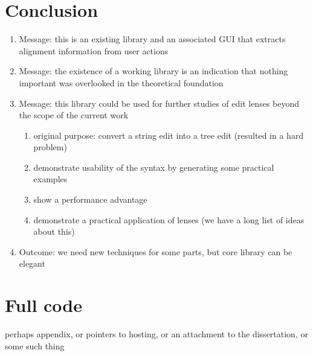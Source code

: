 \section{Conclusion}
\label{sec:impl-conclusion}
\begin{enumerate}
    \item Message: this is an existing library and an associated GUI that extracts alignment information from user actions
    \item Message: the existence of a working library is an indication that nothing important was overlooked in the theoretical foundation
    \item Message: this library could be used for further studies of edit lenses beyond the scope of the current work
        \begin{enumerate}
            \item original purpose: convert a string edit into a tree edit (resulted in a hard problem)
            \item demonstrate usability of the syntax by generating some practical examples
            \item show a performance advantage
            \item demonstrate a practical application of lenses (we have a long list of ideas about this)
        \end{enumerate}
    \item Outcome: we need new techniques for some parts, but core library can be elegant
\end{enumerate}

\section{Full code}
\label{sec:impl-code}
perhaps appendix, or pointers to hosting, or an attachment to the dissertation, or some such thing
